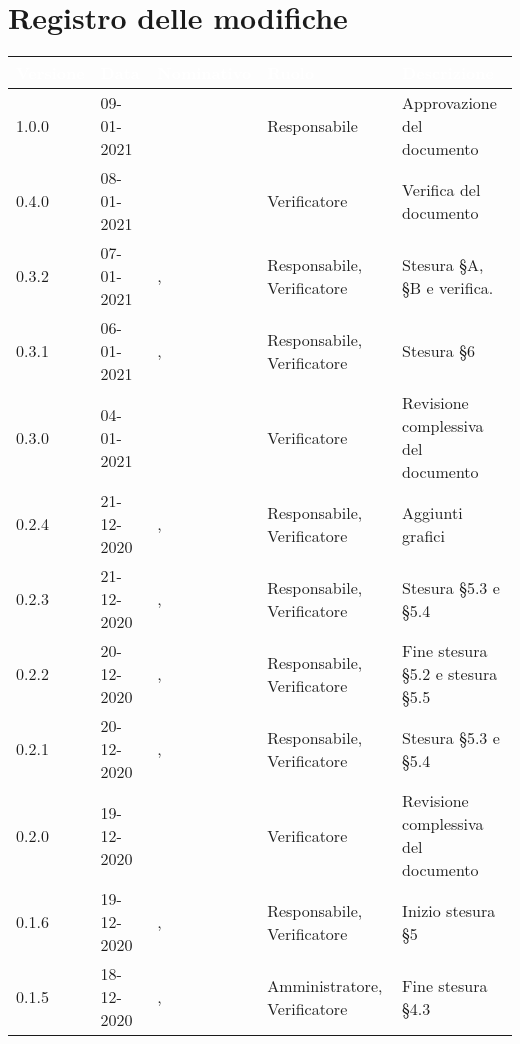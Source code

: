 \section*{Registro delle modifiche}
{
\setcounter{table}{-1}
{
\renewcommand{\arraystretch}{1.5}
\centering
\begin{longtable}{C{1.7cm} C{2.5cm} C{3.2cm} C{2.7cm} C{4.8cm}}
\textcolor{white}{\textbf{Versione}}&
\textcolor{white}{\textbf{Data}}&
\textcolor{white}{\textbf{Nominativo}}&
\textcolor{white}{\textbf{Ruolo}}&
\textcolor{white}{\textbf{Descrizione}}\\	
\endhead

1.0.0 & 09-01-2021 & \SG{} & Responsabile & Approvazione del documento \\

0.4.0 & 08-01-2021 & \ZM{} & Verificatore & Verifica del documento \\

0.3.2 & 07-01-2021 & \BM{}, \ZM{} & Responsabile, Verificatore & Stesura \S A, \S B e verifica. \\

0.3.1 & 06-01-2021 & \BM{}, \SH{} & Responsabile, Verificatore & Stesura \S 6\\

0.3.0 & 04-01-2021 & \SH{} & Verificatore & Revisione complessiva del documento \\

0.2.4 & 21-12-2020 & \SG{}, \SH{} & Responsabile, Verificatore & Aggiunti grafici \\

0.2.3 & 21-12-2020 & \BM{}, \ZM{} & Responsabile, Verificatore & Stesura \S 5.3 e \S 5.4\\

0.2.2 & 20-12-2020 & \SG{}, \ZM{} & Responsabile, Verificatore & Fine stesura \S 5.2 e stesura \S 5.5 \\

0.2.1 & 20-12-2020 & \BM{}, \ZM{} & Responsabile, Verificatore & Stesura \S 5.3 e \S 5.4\\

0.2.0 & 19-12-2020 & \ZM{} & Verificatore & Revisione complessiva del documento \\

0.1.6 & 19-12-2020 & \SG{}, \SH{} & Responsabile, Verificatore & Inizio stesura \S 5 \\

0.1.5 & 18-12-2020 & \PA{}, \SH{} & Amministratore, Verificatore & Fine stesura \S 4.3\\


\end{longtable}}}
